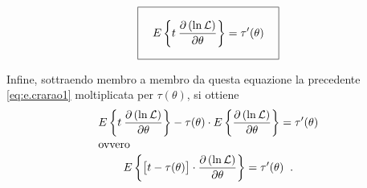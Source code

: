 \begin{equation*}
  \boxed{ \rule[-6mm]{0mm}{14mm} \quad
    E \left\{ t \: \frac{\partial
    \left( \ln \mathcal{L} \right)}{\partial
    \theta} \right\} = \tau ' (\theta) \quad }
\end{equation*}

Infine, sottraendo membro a membro da questa equazione la
precedente \eqref{eq:e.crarao1} moltiplicata per
$\tau(\theta)$, si ottiene
\begin{gather*}
  E \left\{ t \: \frac{\partial \left( \ln \mathcal{L}
    \right)}{\partial \theta} \right\} - \tau(\theta)
    \cdot E \left\{ \frac{\partial \left( \ln \mathcal{L}
    \right)}{\partial \theta} \right\} = \tau' (\theta)
    \\
  \intertext{ovvero}
  E \left \{ \bigl[ t - \tau(\theta) \bigr] \cdot
    \frac{\partial \left( \ln \mathcal{L} \right)}
    {\partial \theta} \right \}
    = \tau' (\theta) \;\; .
\end{gather*}

